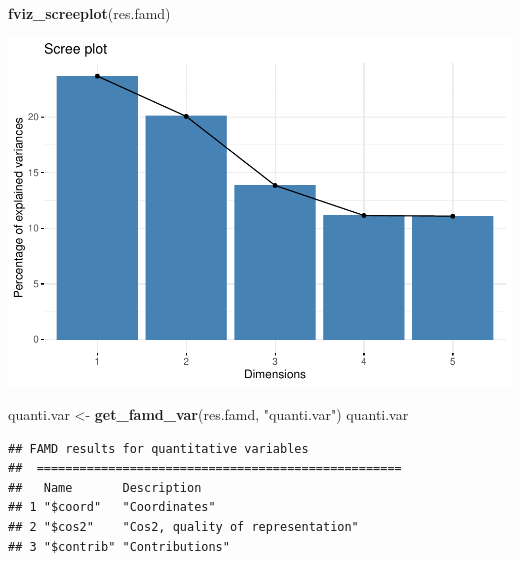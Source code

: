 \documentclass[
]{article}
\newenvironment{Shaded}{\begin{snugshade}}{\end{snugshade}}
\newcommand{\DataTypeTok}[1]{\textcolor[rgb]{0.13,0.29,0.53}{#1}}
\newcommand{\KeywordTok}[1]{\textcolor[rgb]{0.13,0.29,0.53}{\textbf{#1}}}
\newcommand{\NormalTok}[1]{#1}
\newcommand{\OtherTok}[1]{\textcolor[rgb]{0.56,0.35,0.01}{#1}}
\newcommand{\StringTok}[1]{\textcolor[rgb]{0.31,0.60,0.02}{#1}}
\begin{document}
\begin{Shaded}
\begin{Highlighting}[]
\KeywordTok{fviz_screeplot}\NormalTok{(res.famd)}
\end{Highlighting}
\end{Shaded}

\includegraphics{project-code_files/figure-latex/unnamed-chunk-34-1.pdf}

\begin{Shaded}
\begin{Highlighting}[]
\NormalTok{quanti.var <-}\StringTok{ }\KeywordTok{get_famd_var}\NormalTok{(res.famd, }\StringTok{"quanti.var"}\NormalTok{)}
\NormalTok{quanti.var}
\end{Highlighting}
\end{Shaded}

\begin{verbatim}
## FAMD results for quantitative variables 
##  ===================================================
##   Name       Description                      
## 1 "$coord"   "Coordinates"                    
## 2 "$cos2"    "Cos2, quality of representation"
## 3 "$contrib" "Contributions"
\end{verbatim}

\begin{Shaded}
\end{Shaded}
\end{document}
